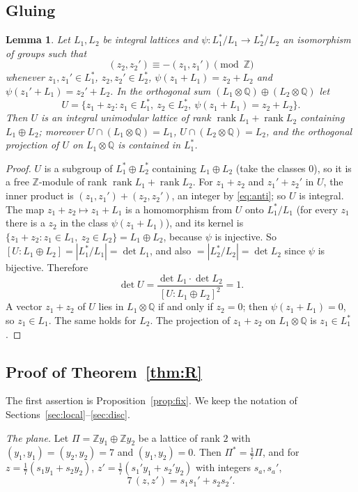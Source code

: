 \documentclass[11pt,a4paper]{article}
\newtheorem{lemma}[theorem]{Lemma}
\theoremstyle{definition}
\theoremstyle{remark}
\newcommand{\ZZ}{\mathbb{Z}}
\newcommand{\QQ}{\mathbb{Q}}
\newcommand{\rk}{\operatorname{rank}}
\begin{document}
\subsection{Gluing}

\begin{lemma}\label{lem:glue}
Let $L_1,L_2$ be integral lattices and $\psi:L_1^*/L_1\to L_2^*/L_2$ an isomorphism of groups such that
\begin{equation}\label{eq:anti}
(z_2,z_2')\equiv-(z_1,z_1')\pmod{\ZZ}
\end{equation}
whenever $z_1,z_1'\in L_1^*$, $z_2,z_2'\in L_2^*$, $\psi(z_1+L_1)=z_2+L_2$ and $\psi(z_1'+L_1)=z_2'+L_2$. In the
orthogonal sum $(L_1\otimes\QQ)\oplus(L_2\otimes\QQ)$ let
\[
U=\{z_1+z_2 : z_1\in L_1^*,\ z_2\in L_2^*,\ \psi(z_1+L_1)=z_2+L_2\}.
\]
Then $U$ is an integral unimodular lattice of rank $\rk L_1+\rk L_2$ containing $L_1\oplus L_2$; moreover
$U\cap(L_1\otimes\QQ)=L_1$, $U\cap(L_2\otimes\QQ)=L_2$, and the orthogonal projection of $U$ on $L_1\otimes\QQ$ is
contained in $L_1^*$.
\end{lemma}
\begin{proof}
$U$ is a subgroup of $L_1^*\oplus L_2^*$ containing $L_1\oplus L_2$ (take the classes $0$), so it is a free
$\ZZ$-module of rank $\rk L_1+\rk L_2$. For $z_1+z_2$ and $z_1'+z_2'$ in $U$, the inner product is
$(z_1,z_1')+(z_2,z_2')$, an integer by \eqref{eq:anti}; so $U$ is integral. The map
$z_1+z_2\mapsto z_1+L_1$ is a homomorphism from $U$ onto $L_1^*/L_1$ (for every $z_1$ there is a $z_2$ in the class
$\psi(z_1+L_1)$), and its kernel is $\{z_1+z_2:z_1\in L_1,\ z_2\in L_2\}=L_1\oplus L_2$, because $\psi$ is
injective. So $[U:L_1\oplus L_2]=|L_1^*/L_1|=\det L_1$, and also $=|L_2^*/L_2|=\det L_2$ since $\psi$ is bijective.
Therefore
\[
\det U=\frac{\det L_1\cdot\det L_2}{[U:L_1\oplus L_2]^2}=1 .
\]
A vector $z_1+z_2$ of $U$ lies in $L_1\otimes\QQ$ if and only if $z_2=0$; then $\psi(z_1+L_1)=0$, so $z_1\in L_1$.
The same holds for $L_2$. The projection of $z_1+z_2$ on $L_1\otimes\QQ$ is $z_1\in L_1^*$.
\end{proof}

\subsection{Proof of Theorem~\ref{thm:R}}
The first assertion is Proposition~\ref{prop:fix}. We keep the notation of
Sections~\ref{sec:local}--\ref{sec:disc}.

\medskip\noindent\emph{The plane.} Let $\Pi=\ZZ y_1\oplus\ZZ y_2$ be a lattice of rank $2$ with
$(y_1,y_1)=(y_2,y_2)=7$ and $(y_1,y_2)=0$. Then $\Pi^*=\frac17\Pi$, and for $z=\frac17(s_1y_1+s_2y_2)$,
$z'=\frac17(s_1'y_1+s_2'y_2)$ with integers $s_a,s_a'$,
\begin{equation}\label{eq:Pi}
7\,(z,z')=s_1s_1'+s_2s_2' .
\end{equation}
\end{document}
